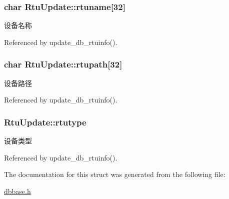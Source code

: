\hypertarget{structRtuUpdate_a2aa61860c8ea0790ffe6f3e2982757a9}{
\subsubsection[{rtuname}]{\setlength{\rightskip}{0pt plus 5cm}char Rtu\-Update\-::rtuname\mbox{[}32\mbox{]}}}\label{structRtuUpdate_a2aa61860c8ea0790ffe6f3e2982757a9}


设备名称 



Referenced by update\-\_\-db\-\_\-rtuinfo().

\hypertarget{structRtuUpdate_a4ff110213c266f79e9ce2fd0fd60c0f1}{
\subsubsection[{rtupath}]{\setlength{\rightskip}{0pt plus 5cm}char Rtu\-Update\-::rtupath\mbox{[}32\mbox{]}}}\label{structRtuUpdate_a4ff110213c266f79e9ce2fd0fd60c0f1}


设备路径 



Referenced by update\-\_\-db\-\_\-rtuinfo().

\hypertarget{structRtuUpdate_a6306c766261ee5d3a1ddf6e3fd950c86}{
\subsubsection[{rtutype}]{ Rtu\-Update\-::rtutype}}\label{structRtuUpdate_a6306c766261ee5d3a1ddf6e3fd950c86}


设备类型 



Referenced by update\-\_\-db\-\_\-rtuinfo().



The documentation for this struct was generated from the following file\-:\begin{DoxyCompactItemize}
\item 
\hyperlink{dbbase_8h}{dbbase.\-h}\end{DoxyCompactItemize}
